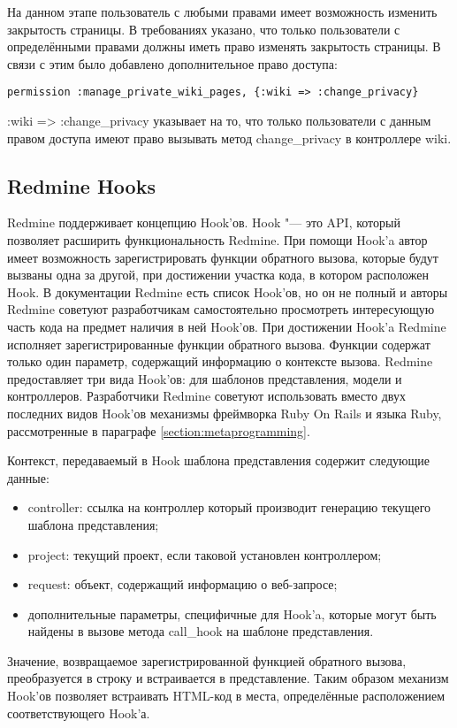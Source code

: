 На данном этапе пользователь с любыми правами имеет возможность изменить
закрытость страницы. В требованиях указано, что только пользователи с
определёнными правами должны иметь право изменять закрытость страницы. В связи
с этим было добавлено дополнительное право доступа:
\small{\begin{lstlisting}
permission :manage_private_wiki_pages, {:wiki => :change_privacy}
\end{lstlisting}}
:wiki => :change\_privacy указывает на то, что только пользователи с данным
правом доступа имеют право вызывать метод change\_privacy в контроллере
wiki.

\subsection{Redmine Hooks}
\label{section:redmine_hooks}
Redmine поддерживает концепцию Hook'ов. Hook "--- это API, который позволяет
расширить функциональность Redmine. При помощи Hook'a автор имеет возможность
зарегистрировать функции обратного вызова, которые будут вызваны одна за
другой, при достижении участка кода, в котором расположен Hook. В документации
Redmine есть список Hook'ов, но он не полный и авторы Redmine советуют
разработчикам самостоятельно просмотреть интересующую часть кода на предмет
наличия в ней Hook'ов. При достижении Hook'a Redmine исполняет
зарегистрированные функции обратного вызова. Функции содержат только один
параметр, содержащий информацию о контексте вызова. Redmine предоставляет три
вида Hook'ов: для шаблонов представления, модели и контроллеров. Разработчики
Redmine советуют использовать вместо двух последних видов Hook'ов механизмы
фреймворка Ruby On Rails и языка Ruby, рассмотренные в параграфе
\ref{section:metaprogramming}.

Контекст, передаваемый в Hook шаблона представления содержит следующие данные:
\begin{itemize}
  \item controller: ссылка на контроллер который производит генерацию
  текущего шаблона представления;
  \item project: текущий проект, если таковой установлен контроллером;
  \item request: объект, содержащий информацию о веб-запросе;
  \item дополнительные параметры, специфичные для Hook'a, которые могут
  быть найдены в вызове метода call\_hook на шаблоне представления.
\end{itemize}
Значение, возвращаемое зарегистрированной функцией обратного вызова,
преобразуется в строку и встраивается в представление. Таким образом механизм
Hook'ов позволяет встраивать HTML-код в места, определённые расположением
соответствующего Hook'а.

